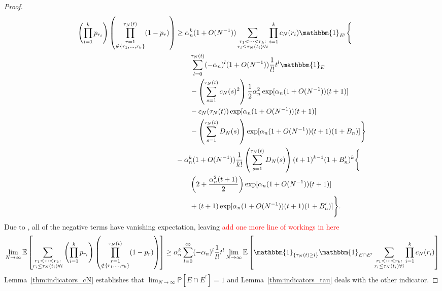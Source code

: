 \documentclass{article}
\newcommand{\seb}[1]{\xspace\textcolor{red}{#1}\xspace}
\newcommand{\Prob}{\mathbb{P}}
\newcommand{\E}{\mathbb{E}}
\newcommand{\I}[1]{\mathbbm{1}_{\{#1\}}}
\newcommand{\1}[1]{\mathbbm{1}_{#1}}
\begin{document}
\begin{proof}
\begin{align}
        \left( \prod_{i=1}^k p_{r_i} \right)
        \left( \prod_{\substack{r=1 \\ \notin \{r_1,\dots,r_k\} }}^{\tau_N(t)} 
        (1-p_r) \right)
&\geq \alpha_n^k (1+O(N^{-1}))
        \sum_{\substack{r_1 <\dots< r_k :\\ r_i \leq \tau_N(t_i) \forall i}}
        \prod_{i=1}^k c_N(r_i) \1{E^\prime} \Bigg\{ \notag\\
    &\qquad \sum_{l=0}^{\tau_N(t)} (-\alpha_n)^l (1+O(N^{-1})) 
        \frac{1}{l!} t^l \1{E} \notag\\
    &\qquad- \left( \sum_{s=1}^{\tau_N(t)} c_N(s)^2 \right)
        \frac{1}{2} \alpha_n^2 \exp[ \alpha_n (1+O(N^{-1})) (t+1) ]\notag\\
    &\qquad- c_N(\tau_N(t)) \exp[ \alpha_n (1+O(N^{-1})) (t+1) ] \notag\\
    &\qquad- \left( \sum_{s=1}^{\tau_N(t)} D_N(s) \right)
        \exp[ \alpha_n (1+O(N^{-1})) (t+1) (1+B_n) ] \Bigg\} \notag\\
&- \alpha_n^k (1+O(N^{-1})) \frac{1}{k!} 
        \left( \sum_{s=1}^{\tau_N(t)} D_N(s) \right)
        (t+1)^{k-1} (1+B_n^\prime)^k \Bigg\{ \notag\\
    &\qquad \left( 2 + \frac{\alpha_n^2 (t+1)}{2} \right) 
        \exp[ \alpha_n (1+O(N^{-1})) (t+1) ] \notag\\
    &\qquad+ (t+1) \exp[ \alpha_n (1+O(N^{-1})) (t+1) (1+B_n^\prime) ] 
        \Bigg\} .
\end{align}
Due to \citet[Equations (3.3)--(3.5)]{brown2021}, all of the negative terms have vanishing expectation, leaving \seb{add one more line of workings in here}
\begin{equation}
\lim_{N\to\infty} \E \left[ 
        \sum_{\substack{r_1 <\dots< r_k :\\ r_i \leq \tau_N(t_i) \forall i}}
        \left( \prod_{i=1}^k p_{r_i} \right)
        \left( \prod_{\substack{r=1 \\ \notin \{r_1,\dots,r_k\} }}^{\tau_N(t)} 
        (1-p_r) \right) \right]
\geq \alpha_n^k
        \sum_{l=0}^{\infty} (-\alpha_n)^l
        \frac{1}{l!} t^l
        \lim_{N\to\infty}\E\left[ \I{\tau_N(t) \geq l} \1{E\cap E^\prime}
        \sum_{\substack{r_1 <\dots< r_k :\\ r_i \leq \tau_N(t_i) \forall i}}
        \prod_{i=1}^k c_N(r_i) \right]
\end{equation}
Lemma~\ref{thm:indicators_cN} establishes that $\lim_{N\to\infty}\Prob[ E\cap E^\prime ] =1$ and Lemma~\ref{thm:indicators_tau} deals with the other indicator.

\end{proof}
\end{document}
